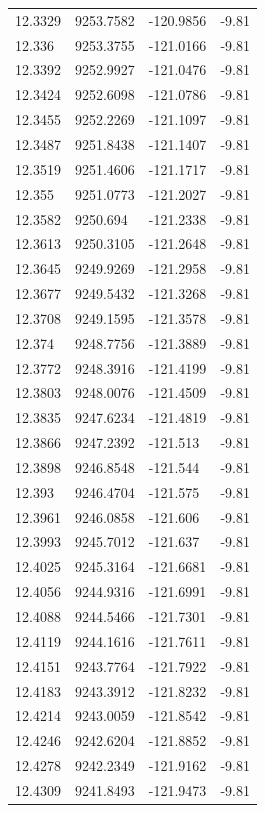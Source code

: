 \begin{table}[H]
\begin{tabular}{llll}
12.3329 & 9253.7582 & -120.9856 & -9.81 \\
12.336 & 9253.3755 & -121.0166 & -9.81 \\
12.3392 & 9252.9927 & -121.0476 & -9.81 \\
12.3424 & 9252.6098 & -121.0786 & -9.81 \\
12.3455 & 9252.2269 & -121.1097 & -9.81 \\
12.3487 & 9251.8438 & -121.1407 & -9.81 \\
12.3519 & 9251.4606 & -121.1717 & -9.81 \\
12.355 & 9251.0773 & -121.2027 & -9.81 \\
12.3582 & 9250.694 & -121.2338 & -9.81 \\
12.3613 & 9250.3105 & -121.2648 & -9.81 \\
12.3645 & 9249.9269 & -121.2958 & -9.81 \\
12.3677 & 9249.5432 & -121.3268 & -9.81 \\
12.3708 & 9249.1595 & -121.3578 & -9.81 \\
12.374 & 9248.7756 & -121.3889 & -9.81 \\
12.3772 & 9248.3916 & -121.4199 & -9.81 \\
12.3803 & 9248.0076 & -121.4509 & -9.81 \\
12.3835 & 9247.6234 & -121.4819 & -9.81 \\
12.3866 & 9247.2392 & -121.513 & -9.81 \\
12.3898 & 9246.8548 & -121.544 & -9.81 \\
12.393 & 9246.4704 & -121.575 & -9.81 \\
12.3961 & 9246.0858 & -121.606 & -9.81 \\
12.3993 & 9245.7012 & -121.637 & -9.81 \\
12.4025 & 9245.3164 & -121.6681 & -9.81 \\
12.4056 & 9244.9316 & -121.6991 & -9.81 \\
12.4088 & 9244.5466 & -121.7301 & -9.81 \\
12.4119 & 9244.1616 & -121.7611 & -9.81 \\
12.4151 & 9243.7764 & -121.7922 & -9.81 \\
12.4183 & 9243.3912 & -121.8232 & -9.81 \\
12.4214 & 9243.0059 & -121.8542 & -9.81 \\
12.4246 & 9242.6204 & -121.8852 & -9.81 \\
12.4278 & 9242.2349 & -121.9162 & -9.81 \\
12.4309 & 9241.8493 & -121.9473 & -9.81 \\

\end{tabular}
\end{table}

